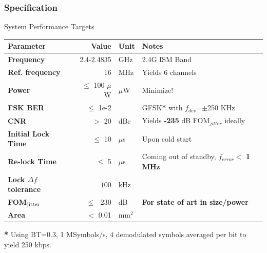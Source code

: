 \documentclass[t, screen, aspectratio=43]{beamer}
\begin{document}
\begin{frame}
	\frametitle{Specification\color{black}}
	\begin{block}{System Performance Targets}
		\tiny
		\begin{table}[h!]
			\centering
			\def\arraystretch{1.5}		
			\setlength\arrayrulewidth{0.75pt}
			\setlength{\tabcolsep}{1em} %
			\begin{tabular}{|l|r|l|l|}
				\hline 
				\rule[-1ex]{0pt}{2.5ex} \cellcolor{gray!40}\textbf{Parameter} & \cellcolor{gray!40}\textbf{Value} & \cellcolor{gray!40}\textbf{Unit }& \cellcolor{gray!40}\textbf{Notes}\\ 
				\hline 
				\rule[-1ex]{0pt}{2.5ex} \textbf{Frequency}  & 2.4-2.4835 & GHz & 2.4G ISM Band\\ 
				\hline 
				\rule[-1ex]{0pt}{2.5ex} \textbf{Ref. frequency} & 16 & MHz & Yields 6 channels \\ 
				\hline 
				\rule[-1ex]{0pt}{2.5ex} \textbf{Power} & $\leq$ 100 $\mu$W  &$\mu$W & Minimize!\\ 
				\hline 
				\rule[-1ex]{0pt}{2.5ex} \textbf{FSK BER} & $\leq$ 1e-2  & & GFSK\textbf{*} with $f_{dev}$=$\pm$250 KHz\\ 
				\hline 
				\rule[-1ex]{0pt}{2.5ex} \textbf{CNR} & $>$ 20 & dBc&Yields  \textbf{-235} dB FOM$_{jitter}$ ideally \\ 
				\hline 
				\rule[-1ex]{0pt}{2.5ex} \textbf{Initial Lock Time} & $\leq$ 10 & $\mu$s & Upon cold start \\ 
				\hline 
				\rule[-1ex]{0pt}{2.5ex} \textbf{Re-lock Time} & $\leq$ 5 & $\mu$s & Coming out of standby, $f_{error} <$ \textbf{1 MHz} \\ 
				\hline 
				\rule[-1ex]{0pt}{2.5ex} \textbf{Lock $\Delta f$ tolerance} & $100$ & kHz& \\ 
				\hline 
				\rule[-1ex]{0pt}{2.5ex} \textbf{FOM}$_{\textnormal{jitter}}$ & $\leq$ -230 & dB & \textbf{For state of art in size/power} \\ 
				\hline 
				\rule[-1ex]{0pt}{2.5ex} \textbf{Area} & $<$ 0.01  & mm$^2$ & \\ 
				\hline 
			\end{tabular} 
		\end{table}   
		\textbf{*} Using BT=0.3, 1 MSymbols/s, 4 demodulated symbols averaged per bit to yield 250 kbps.
	\end{block}    
\end{frame}
\end{document}
